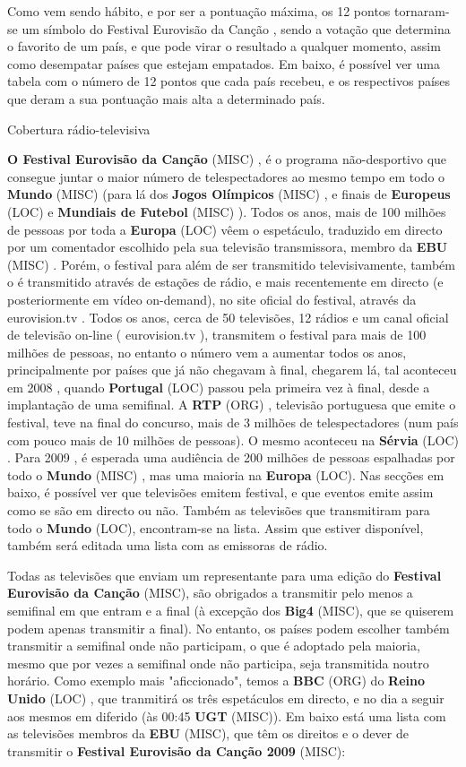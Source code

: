\documentclass[12pt,a4paper]{article}
\begin{document}
Como vem sendo hábito, e por ser a pontuação máxima, os 12 pontos tornaram-se um símbolo do Festival Eurovisão da Canção , sendo a votação que determina o favorito de um país, e que pode virar o resultado a qualquer momento, assim como desempatar países que estejam empatados. Em baixo, é possível ver uma tabela com o número de 12 pontos que cada país recebeu, e os respectivos países que deram a sua pontuação mais alta a determinado país.



Cobertura rádio-televisiva

\textbf{O Festival Eurovisão da Canção} (MISC) , é o programa não-desportivo que consegue juntar o maior número de telespectadores ao mesmo tempo em todo o \textbf{Mundo} (MISC) (para lá dos \textbf{Jogos Olímpicos} (MISC) , e finais de \textbf{Europeus} (LOC) e \textbf{Mundiais de Futebol} (MISC) ). Todos os anos, mais de 100 milhões de pessoas por toda a \textbf{Europa} (LOC) vêem o espetáculo, traduzido em directo por um comentador escolhido pela sua televisão transmissora, membro da \textbf{EBU} (MISC) . Porém, o festival para além de ser transmitido televisivamente, também o é transmitido através de estações de rádio, e mais recentemente em directo (e posteriormente em vídeo on-demand), no site oficial do festival, através da eurovision.tv . Todos os anos, cerca de 50 televisões, 12 rádios e um canal oficial de televisão on-line ( eurovision.tv ), transmitem o festival para mais de 100 milhões de pessoas, no entanto o número vem a aumentar todos os anos, principalmente por países que já não chegavam à final, chegarem lá, tal aconteceu em 2008 , quando \textbf{Portugal} (LOC) passou pela primeira vez à final, desde a implantação de uma semifinal. A \textbf{RTP} (ORG) , televisão portuguesa que emite o festival, teve na final do concurso, mais de 3 milhões de telespectadores (num país com pouco mais de 10 milhões de pessoas). O mesmo aconteceu na \textbf{Sérvia} (LOC) . Para 2009 , é esperada uma audiência de 200 milhões de pessoas espalhadas por todo o \textbf{Mundo} (MISC) , mas uma maioria na \textbf{Europa} (LOC). Nas secções em baixo, é possível ver que televisões emitem festival, e que eventos emite assim como se são em directo ou não. Também as televisões que transmitiram para todo o \textbf{Mundo} (LOC), encontram-se na lista. Assim que estiver disponível, também será editada uma lista com as emissoras de rádio.

Todas as televisões que enviam um representante para uma edição do \textbf{Festival Eurovisão da Canção} (MISC), são obrigados a transmitir pelo menos a semifinal em que entram e a final (à excepção dos \textbf{Big4} (MISC), que se quiserem podem apenas transmitir a final). No entanto, os países podem escolher também transmitir a semifinal onde não participam, o que é adoptado pela maioria, mesmo que por vezes a semifinal onde não participa, seja transmitida noutro horário. Como exemplo mais "aficcionado", temos a \textbf{BBC} (ORG) do \textbf{Reino Unido} (LOC) , que tranmitirá os três espetáculos em directo, e no dia a seguir aos mesmos em diferido (às 00:45 \textbf{UGT} (MISC)). Em baixo está uma lista com as televisões membros da \textbf{EBU} (MISC), que têm os direitos e o dever de transmitir o \textbf{Festival Eurovisão da Canção 2009} (MISC):
\end{document}
